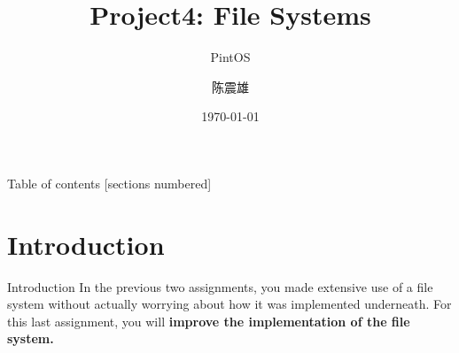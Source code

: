 \documentclass[10pt]{beamer}
\title{Project4: File Systems}
\subtitle{PintOS}
\date{\today}
\author{陈震雄}
\institute{武汉大学}
\begin{document}
\maketitle

\begin{frame}{Table of contents}
  [sections numbered]
  \tableofcontents[hideallsubsections]
\end{frame}
\section{Introduction}
\begin{frame}[fragile]{Introduction}
    In the previous two assignments, you made extensive use of a file system without actually worrying about how it was implemented underneath. For this last assignment, you will \textbf{improve the implementation of the file system.}
\end{frame}
\end{document}
